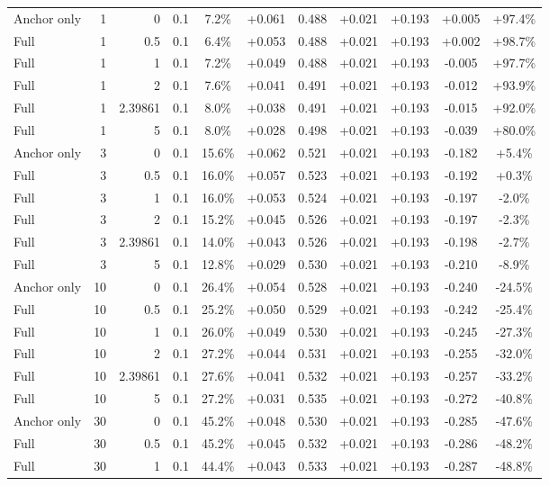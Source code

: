 \begin{table}[htbp]
\begin{tabular}{lrrrccccccc}
Anchor only & 1 & 0 & 0.1 & 7.2\% & +0.061 & 0.488 & +0.021 & +0.193 & +0.005 & +97.4\% \\
Full & 1 & 0.5 & 0.1 & 6.4\% & +0.053 & 0.488 & +0.021 & +0.193 & +0.002 & +98.7\% \\
Full & 1 & 1 & 0.1 & 7.2\% & +0.049 & 0.488 & +0.021 & +0.193 & -0.005 & +97.7\% \\
Full & 1 & 2 & 0.1 & 7.6\% & +0.041 & 0.491 & +0.021 & +0.193 & -0.012 & +93.9\% \\
Full & 1 & 2.39861 & 0.1 & 8.0\% & +0.038 & 0.491 & +0.021 & +0.193 & -0.015 & +92.0\% \\
Full & 1 & 5 & 0.1 & 8.0\% & +0.028 & 0.498 & +0.021 & +0.193 & -0.039 & +80.0\% \\
Anchor only & 3 & 0 & 0.1 & 15.6\% & +0.062 & 0.521 & +0.021 & +0.193 & -0.182 & +5.4\% \\
Full & 3 & 0.5 & 0.1 & 16.0\% & +0.057 & 0.523 & +0.021 & +0.193 & -0.192 & +0.3\% \\
Full & 3 & 1 & 0.1 & 16.0\% & +0.053 & 0.524 & +0.021 & +0.193 & -0.197 & -2.0\% \\
Full & 3 & 2 & 0.1 & 15.2\% & +0.045 & 0.526 & +0.021 & +0.193 & -0.197 & -2.3\% \\
Full & 3 & 2.39861 & 0.1 & 14.0\% & +0.043 & 0.526 & +0.021 & +0.193 & -0.198 & -2.7\% \\
Full & 3 & 5 & 0.1 & 12.8\% & +0.029 & 0.530 & +0.021 & +0.193 & -0.210 & -8.9\% \\
Anchor only & 10 & 0 & 0.1 & 26.4\% & +0.054 & 0.528 & +0.021 & +0.193 & -0.240 & -24.5\% \\
Full & 10 & 0.5 & 0.1 & 25.2\% & +0.050 & 0.529 & +0.021 & +0.193 & -0.242 & -25.4\% \\
Full & 10 & 1 & 0.1 & 26.0\% & +0.049 & 0.530 & +0.021 & +0.193 & -0.245 & -27.3\% \\
Full & 10 & 2 & 0.1 & 27.2\% & +0.044 & 0.531 & +0.021 & +0.193 & -0.255 & -32.0\% \\
Full & 10 & 2.39861 & 0.1 & 27.6\% & +0.041 & 0.532 & +0.021 & +0.193 & -0.257 & -33.2\% \\
Full & 10 & 5 & 0.1 & 27.2\% & +0.031 & 0.535 & +0.021 & +0.193 & -0.272 & -40.8\% \\
Anchor only & 30 & 0 & 0.1 & 45.2\% & +0.048 & 0.530 & +0.021 & +0.193 & -0.285 & -47.6\% \\
Full & 30 & 0.5 & 0.1 & 45.2\% & +0.045 & 0.532 & +0.021 & +0.193 & -0.286 & -48.2\% \\
Full & 30 & 1 & 0.1 & 44.4\% & +0.043 & 0.533 & +0.021 & +0.193 & -0.287 & -48.8\% \\

\end{tabular}
\end{table}
